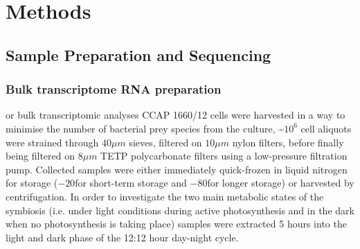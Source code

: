 
\section{Methods} 

\subsection{Sample Preparation and Sequencing}

\subsubsection{Bulk transcriptome RNA preparation}
or bulk transcriptomic analyses CCAP 1660/12 cells were harvested in a way to minimise the 
number of bacterial prey species from the culture, \textasciitilde \(10^{6}\) 
cell aliquots were strained through \(40\mu m\) sieves, filtered on 
\(10 \mu m\) nylon filters, 
before finally being filtered on \(8 \mu m\) TETP polycarbonate filters using a 
low-pressure filtration pump.  Collected samples were either immediately 
quick-frozen in liquid nitrogen for storage (\(-20\)\celsius for short-term storage 
and \(-80\)\celsius for longer storage) or harvested by centrifugation.  
In order to investigate the two main metabolic states of the symbiosis 
(i.e. under light conditions during active photosynthesis and in the dark 
when no photosynthesis is taking place) samples were extracted 5 hours into 
the light and dark phase of the 12:12 hour day-night cycle.

